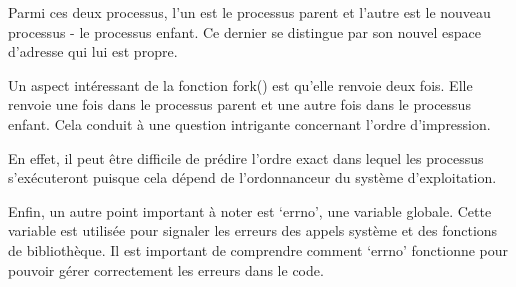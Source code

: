 \documentclass[12pt]{article}
\begin{document}
Parmi ces deux processus, l'un est le processus parent et l'autre est le nouveau processus - le processus enfant. Ce dernier se distingue par son nouvel espace d'adresse qui lui est propre. 

Un aspect intéressant de la fonction fork() est qu'elle renvoie deux fois. Elle renvoie une fois dans le processus parent et une autre fois dans le processus enfant. Cela conduit à une question intrigante concernant l'ordre d'impression. 

En effet, il peut être difficile de prédire l'ordre exact dans lequel les processus s'exécuteront puisque cela dépend de l'ordonnanceur du système d'exploitation. 

Enfin, un autre point important à noter est ‘errno’, une variable globale. Cette variable est utilisée pour signaler les erreurs des appels système et des fonctions de bibliothèque. Il est important de comprendre comment ‘errno’ fonctionne pour pouvoir gérer correctement les erreurs dans le code.
\end{document}
